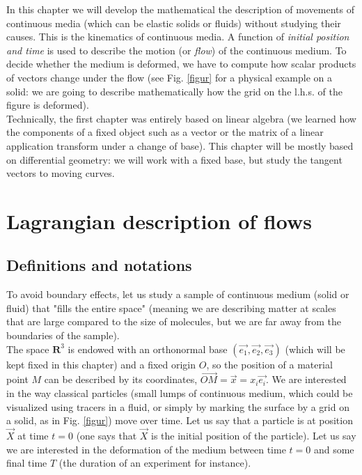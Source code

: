 \documentclass[DIV=12]{article}
\begin{document}
\vspace{12mm}
In this chapter we will develop the mathematical the description  of 
 movements of continuous media  (which can be elastic solids or fluids) without studying their causes. This is the kinematics of 
 continuous media. A function of {\emph{initial position and time}} is
 used to describe the motion (or {\emph{flow}}) of the continuous medium. 
 To decide whether the medium is deformed, we have to compute how
 scalar products of vectors change under the flow (see Fig. \ref{figur} for
 a physical example on a solid: we are going to describe mathematically how the grid 
on the l.h.s. of the figure is deformed).\\
Technically, the first chapter was entirely based on linear algebra (we learned how the components
 of a fixed object such as a vector or the matrix of a linear application transform under a change of base). 
 This chapter will be mostly based on differential geometry: we will work with a 
 fixed base, but study the tangent vectors to moving curves.


\section{Lagrangian description of flows}
\subsection{Definitions and notations}
To avoid boundary effects, let us study a sample of continuous 
medium (solid or fluid) that "fills the entire space" (meaning we are describing
matter at scales that are large compared to the size of molecules, but we are far away from 
 the boundaries of the sample).\\

The space ${\mathbf{R}}^3$ is endowed with 
 an orthonormal base $(\vec{e_1}, \vec{e_2}, \vec{e_3})$ (which will be kept fixed in this chapter)
  and a
 fixed origin $O$, so the position of a material point $M$ can be described 
 by its coordinates, $\overrightarrow{OM} =\vec{x}= x_i\vec{e_i}$.
We are interested in the way  classical particles (small lumps of continuous medium, which could be 
visualized using tracers in a fluid, or simply by marking the surface by a grid on a solid, as in Fig. \ref{figur}) move over time. Let us say that a particle
 is at position $\vec{X}$ at time $t =0$ (one says that $\vec{X}$ is the initial position of the particle). 
 Let us say we are interested in the deformation of the medium between time $t=0$ and some final time $T$ (the duration
 of an experiment for instance). \\
 
\end{document}
